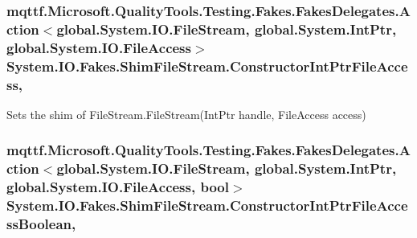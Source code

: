 \hypertarget{class_system_1_1_i_o_1_1_fakes_1_1_shim_file_stream_a09678c8fbe0f17f679755e2579409475}{
\subsubsection[{Constructor\-Int\-Ptr\-File\-Access}]{\setlength{\rightskip}{0pt plus 5cm}mqttf.\-Microsoft.\-Quality\-Tools.\-Testing.\-Fakes.\-Fakes\-Delegates.\-Action$<$global.\-System.\-I\-O.\-File\-Stream, global.\-System.\-Int\-Ptr, global.\-System.\-I\-O.\-File\-Access$>$ System.\-I\-O.\-Fakes.\-Shim\-File\-Stream.\-Constructor\-Int\-Ptr\-File\-Access\hspace{0.3cm}{\ttfamily [static]}, {\ttfamily [set]}}}\label{class_system_1_1_i_o_1_1_fakes_1_1_shim_file_stream_a09678c8fbe0f17f679755e2579409475}


Sets the shim of File\-Stream.\-File\-Stream(\-Int\-Ptr handle, File\-Access access)

\hypertarget{class_system_1_1_i_o_1_1_fakes_1_1_shim_file_stream_a034e423bb6387e5f32269518c2111889}{
\subsubsection[{Constructor\-Int\-Ptr\-File\-Access\-Boolean}]{\setlength{\rightskip}{0pt plus 5cm}mqttf.\-Microsoft.\-Quality\-Tools.\-Testing.\-Fakes.\-Fakes\-Delegates.\-Action$<$global.\-System.\-I\-O.\-File\-Stream, global.\-System.\-Int\-Ptr, global.\-System.\-I\-O.\-File\-Access, bool$>$ System.\-I\-O.\-Fakes.\-Shim\-File\-Stream.\-Constructor\-Int\-Ptr\-File\-Access\-Boolean\hspace{0.3cm}{\ttfamily [static]}, {\ttfamily [set]}}}\label{class_system_1_1_i_o_1_1_fakes_1_1_shim_file_stream_a034e423bb6387e5f32269518c2111889}


